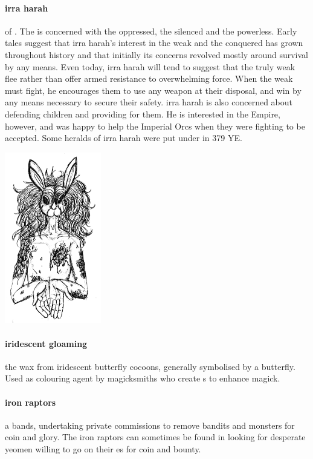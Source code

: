 \paragraph{irra harah}  of . The  is concerned with the oppressed, the silenced and the powerless. Early tales suggest that irra harah's interest in the weak and the conquered has grown throughout history and that initially its concerns revolved mostly around survival by any means. Even today, irra harah will tend to suggest that the truly weak flee rather than offer armed resistance to overwhelming force. When the weak must fight, he encourages them to use any weapon at their disposal, and win by any means necessary to secure their safety. irra harah is also concerned about defending children and providing for them. He is interested in the Empire, however, and was happy to help the Imperial Orcs when they were fighting to be accepted. Some heralds of irra harah were put under  in 379 YE.\begin{center}\includegraphics[width=4.2cm]{encyclopedia/IrraHarah} \end{center}
\paragraph{iridescent gloaming} the wax from iridescent butterfly cocoons, generally symbolised by a butterfly. Used as colouring agent by magicksmiths who create s to enhance magick.
\paragraph{iron raptors} a  bands, undertaking private commissions to remove bandits and monsters for coin and glory. The iron raptors can sometimes be found in  looking for desperate yeomen willing to go on their es for coin and bounty.
